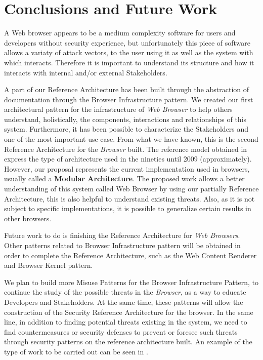 \documentclass{sig-alternate-05-2015}
\begin{document}
\section*{Conclusions and Future Work}
A Web browser appears to be a medium complexity software for users and developers without security experience, but unfortunately this piece of software allows a variaty of attack vectors, to the user using it as well as the system with which interacts. Therefore it is important to understand its structure and how it interacts with internal and/or external Stakeholders.

A part of our Reference Architecture has been built through the abstraction of documentation through the Browser Infrastructure pattern. We created our first architectural pattern for the infrastructure of \textit{Web Browser} to help others understand, holistically, the components, interactions and relationships of this system. Furthermore, it has been possible to characterize the Stakeholders and one of the most important use case. From what we have known, this is the second Reference Architecture for the \textit{Browser} built. The reference model obtained in \cite{2005-grosskurth-browser-refarch} express the type of architecture used in the nineties until 2009 (approximately). However, our proposal represents the current implementation used in browsers, usually called a \textbf{Modular Architecture}. The proposed work allows a better understanding of this system called Web Browser by using our partially Reference Architecture, this is also helpful to understand existing threats. Also, as it is not subject to specific implementations, it is possible to generalize certain results in other browsers. 

Future work to do is finishing the Reference Architecture for \textit{Web Browsers}. Other patterns related to Browser Infrastructure pattern will be obtained in order to complete the Reference Architecture, such as the Web Content Renderer and Browser Kernel pattern. 

We plan to build more Misuse Patterns for the Browser Infrastructure Pattern, to continue the study of the possible threats in the \textit{Browser}, as a way to educate Developers and Stakeholders. At the same time, these patterns will allow the construction of the Security Reference Architecture for the browser. In the same line, in addition to finding potential threats existing in the system, we need to find countermeasures or security defenses to prevent or foresee such threats through security patterns on the reference architecture built. An example of the type of work to be carried out can be seen in \cite{Fernandez2015}.

  

\end{document}
